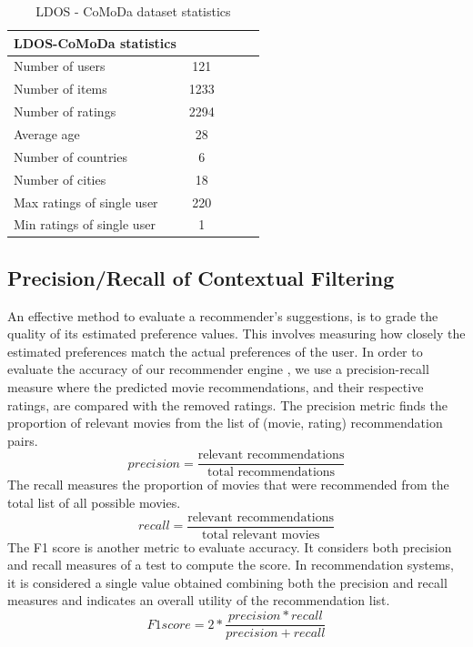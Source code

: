 \documentclass{article}
\begin{document}
\begin{table} [H]
	\caption{LDOS - CoMoDa dataset statistics}
	\label{ldos}
	\vskip 0.15in      
	\begin{center}
	\begin{small}
	\begin{sc}
    \begin{tabular}{lcccr}
	\hline
	\abovespace\belowspace
	LDOS-CoMoDa statistics\\
    \hline
    \abovespace
    Number of users            & 121 \\
    Number of items            & 1233  \\
    Number of ratings          & 2294  \\
    Average age                & 28  \\
    Number of countries        & 6  \\
    Number of cities           & 18  \\
    Max ratings of single user & 220  \\
    \belowspace
	Min ratings of single user & 1  \\
	\hline
	\end{tabular}
	\end{sc}
	\end{small}
	\end{center}
	\vskip -0.1in
\end{table}

\subsection{Precision/Recall of Contextual Filtering}
An effective method to evaluate a recommender's suggestions, is to grade the quality of its estimated preference values. This involves measuring how closely the estimated preferences match the actual preferences of the user. In order to evaluate the accuracy of our recommender engine , we use a precision-recall measure where the predicted movie recommendations, and their respective ratings, are compared with the removed ratings. The precision metric finds the proportion of relevant movies from the list of (movie, rating) recommendation pairs. 
\begin{equation}
precision = \frac{\text{relevant recommendations}} {\text{total recommendations}}
\end{equation} 
The recall measures the proportion of movies that were recommended from the total list of all possible movies.
\begin{equation}
recall = \frac{\text{relevant recommendations}}{\text{total relevant movies}}
\end{equation}
 The F1 score is another metric to evaluate accuracy.  It considers both precision and recall measures of a test to compute the score. In recommendation systems, it is considered a single value obtained combining both the precision and recall measures and indicates an overall utility of the recommendation list.
\begin{equation}
F1 score = 2 * \frac{precision * recall}{precision + recall}
\end{equation}
\end{document}

